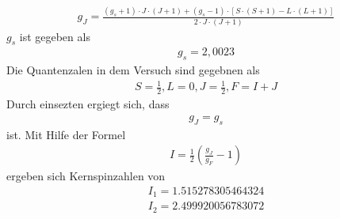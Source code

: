 \begin{align*}
  g_J = \frac{(g_s+1)\cdot J\cdot(J+1)+(g_s-1)\cdot[S\cdot (S+1)-L\cdot (L+1)]}{2\cdot J \cdot (J+1)}
\end{align*}
$g_s$ ist gegeben als
\begin{align*}
  g_s = 2,0023
\end{align*}
Die Quantenzalen in dem Versuch sind gegebnen als
\begin{align*}
  S = \frac{1}{2}, L=0, J=\frac{1}{2}, F = I+J
\end{align*}
Durch einsezten ergiegt sich, dass
\begin{align*}
  g_J=g_s
\end{align*}
ist.
Mit Hilfe der Formel
\begin{align*}
  I = \frac{1}{2}\left(\frac{g_J}{g_F}-1\right)
\end{align*}
ergeben sich Kernspinzahlen von
\begin{align*}
  I_1=1.515278305464324\\
  I_2=2.499920056783072
\end{align*}
